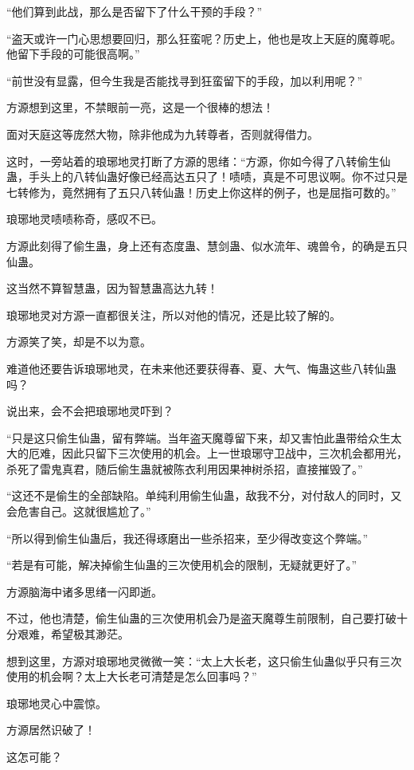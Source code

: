 \begin{this_body}
“他们算到此战，那么是否留下了什么干预的手段？”

“盗天或许一门心思想要回归，那么狂蛮呢？历史上，他也是攻上天庭的魔尊呢。他留下手段的可能很高啊。”

“前世没有显露，但今生我是否能找寻到狂蛮留下的手段，加以利用呢？”

方源想到这里，不禁眼前一亮，这是一个很棒的想法！

面对天庭这等庞然大物，除非他成为九转尊者，否则就得借力。

这时，一旁站着的琅琊地灵打断了方源的思绪：“方源，你如今得了八转偷生仙蛊，手头上的八转仙蛊好像已经高达五只了！啧啧，真是不可思议啊。你不过只是七转修为，竟然拥有了五只八转仙蛊！历史上你这样的例子，也是屈指可数的。”

琅琊地灵啧啧称奇，感叹不已。

方源此刻得了偷生蛊，身上还有态度蛊、慧剑蛊、似水流年、魂兽令，的确是五只仙蛊。

这当然不算智慧蛊，因为智慧蛊高达九转！

琅琊地灵对方源一直都很关注，所以对他的情况，还是比较了解的。

方源笑了笑，却是不以为意。

难道他还要告诉琅琊地灵，在未来他还要获得春、夏、大气、悔蛊这些八转仙蛊吗？

说出来，会不会把琅琊地灵吓到？

“只是这只偷生仙蛊，留有弊端。当年盗天魔尊留下来，却又害怕此蛊带给众生太大的厄难，因此只留下三次使用的机会。上一世琅琊守卫战中，三次机会都用光，杀死了雷鬼真君，随后偷生蛊就被陈衣利用因果神树杀招，直接摧毁了。”

“这还不是偷生的全部缺陷。单纯利用偷生仙蛊，敌我不分，对付敌人的同时，又会危害自己。这就很尴尬了。”

“所以得到偷生仙蛊后，我还得琢磨出一些杀招来，至少得改变这个弊端。”

“若是有可能，解决掉偷生仙蛊的三次使用机会的限制，无疑就更好了。”

方源脑海中诸多思绪一闪即逝。

不过，他也清楚，偷生仙蛊的三次使用机会乃是盗天魔尊生前限制，自己要打破十分艰难，希望极其渺茫。

想到这里，方源对琅琊地灵微微一笑：“太上大长老，这只偷生仙蛊似乎只有三次使用的机会啊？太上大长老可清楚是怎么回事吗？”

琅琊地灵心中震惊。

方源居然识破了！

这怎可能？


\end{this_body}
